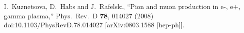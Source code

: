 \documentclass[onecolumn,preprintnumbers,amsmath,amssymb]{revtex4}
\begin{document}
\begin{thebibliography}{99}

I.~Kuznetsova, D.~Habs and J.~Rafelski,
``Pion and muon production in e-, e+, gamma plasma,''
Phys.\ Rev.\ D \textbf{78}, 014027 (2008)
doi:10.1103/PhysRevD.78.014027
[arXiv:0803.1588 [hep-ph]].

 



 \end{thebibliography}
\end{document}
